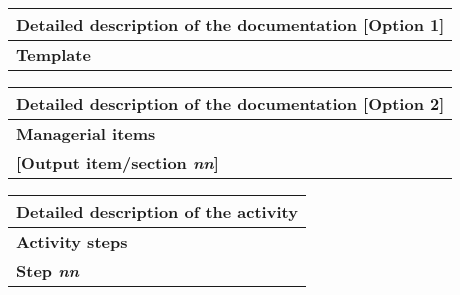 %
\begin{tabular}{|p{3.2cm}|p{11cm}|}
  \hline
  \multicolumn{2}{|c|}{\textbf{Detailed description of the
      documentation [Option 1]}} \\\hline
  \textbf{Template}  &
  \\\hline
\end{tabular}

%
\begin{tabular}{|p{3.2cm}|p{11cm}|}
  \hline
  \multicolumn{2}{|c|}{\textbf{Detailed description of the
      documentation [Option 2]}} \\\hline
  \textbf{Managerial items} & 
  \\\hline
  \textbf{[Output item/section \textit{nn}]} & 
  \\\hline
\end{tabular}



\begin{tabular}{|p{3.2cm}|p{11cm}|}
  \hline
  \multicolumn{2}{|c|}{\textbf{Detailed description of the activity}} \\\hline
  \textbf{Activity steps} & 
  \\\hline
  \textbf{Step \textit{nn}} & 
  \\\hline
\end{tabular}

